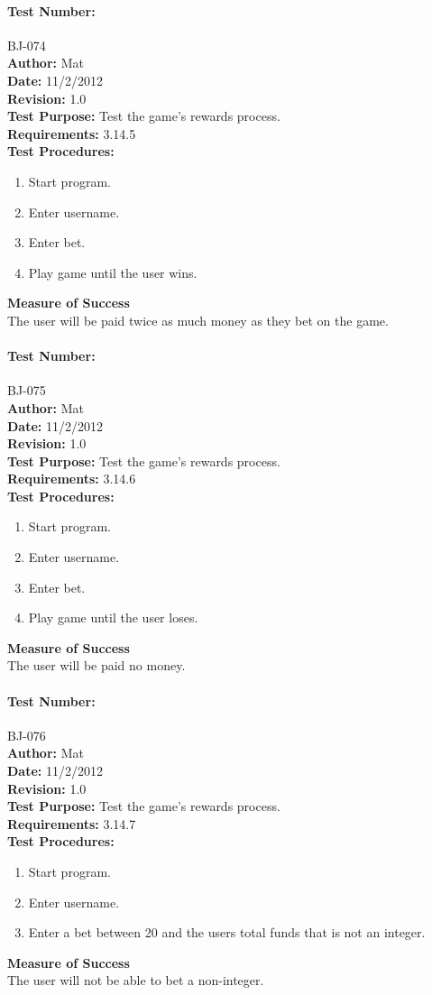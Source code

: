 \documentclass{article}
\begin{document}
\paragraph{Test Number:} BJ-074\\
\textbf{Author:} Mat\\
\textbf{Date:} 11/2/2012\\
\textbf{Revision:} 1.0\\
\textbf{Test Purpose:} Test the game's rewards process.\\
\textbf{Requirements:} 3.14.5 \\
\textbf{Test Procedures:} 
\begin{enumerate}
\item Start program.
\item Enter username.
\item Enter bet.
\item Play game until the user wins.
\end{enumerate}
\textbf{Measure of Success}\\The user will be paid twice as much money as they bet on the game.
\paragraph{Test Number:} BJ-075\\
\textbf{Author:} Mat\\
\textbf{Date:} 11/2/2012\\
\textbf{Revision:} 1.0\\
\textbf{Test Purpose:} Test the game's rewards process.\\
\textbf{Requirements:} 3.14.6 \\
\textbf{Test Procedures:} 
\begin{enumerate}
\item Start program.
\item Enter username.
\item Enter bet.
\item Play game until the user loses.
\end{enumerate}
\textbf{Measure of Success}\\The user will be paid no money.
\paragraph{Test Number:} BJ-076\\
\textbf{Author:} Mat\\
\textbf{Date:} 11/2/2012\\
\textbf{Revision:} 1.0\\
\textbf{Test Purpose:} Test the game's rewards process.\\
\textbf{Requirements:} 3.14.7 \\
\textbf{Test Procedures:} 
\begin{enumerate}
\item Start program.
\item Enter username.
\item Enter a bet between 20 and the users total funds that is not an integer.
\end{enumerate}
\textbf{Measure of Success}\\The user will not be able to bet a non-integer.
\end{document}
